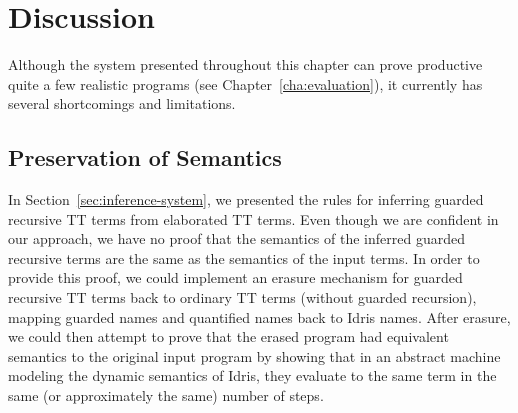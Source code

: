 


\section{Discussion}
\label{sec:discussion}
Although the system presented throughout this chapter can prove productive quite
a few realistic programs (see Chapter~\ref{cha:evaluation}), it currently has
several shortcomings and limitations.

\subsection{Preservation of Semantics}
\label{sec:pres-semant}
In Section~\ref{sec:inference-system}, we presented the rules for inferring
guarded recursive TT terms from elaborated TT terms. Even though we are
confident in our approach, we have no proof that the semantics of the inferred
guarded recursive terms are the same as the semantics of the input terms. In
order to provide this proof, we could implement an erasure mechanism for guarded
recursive TT terms back to ordinary TT terms (without guarded recursion),
mapping guarded names and quantified names back to Idris names. After erasure,
we could then attempt to prove that the erased program had equivalent semantics to the
original input program by showing that in an abstract machine modeling the
dynamic semantics of Idris, they evaluate to the same term in the same (or
approximately the same) number of steps.




